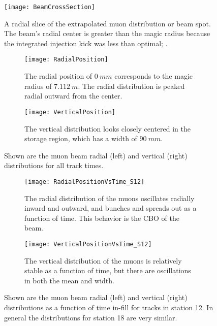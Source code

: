 \begin{figure}
  \centering
  \texttt{[image: BeamCrossSection]}
    \caption[Extrapolated muon beam distribution cross-section]{A radial slice of the extrapolated muon distribution or beam spot. The beam's radial center is greater than the magic radius because the integrated injection kick was less than optimal; .}
    \label{fig:BeamCrossSection}
\end{figure}


\begin{figure}
\centering
    \begin{subfigure}[t]{0.47\textwidth}
        \centering
        \texttt{[image: RadialPosition]}
        \caption{The radial position of $\SI{0}{mm}$ corresponds to the magic radius of $\SI{7.112}{m}$. The radial distribution is peaked radial outward from the center.}
    \end{subfigure}
    \hspace{5mm}
    \begin{subfigure}[t]{0.47\textwidth}
        \centering
        \texttt{[image: VerticalPosition]}
        \caption{The vertical distribution looks closely centered in the storage region, which has a width of $\SI{90}{mm}$.}
    \end{subfigure}
\caption[Muon beam radial and vertical distributions]{Shown are the muon beam radial (left) and vertical (right) distributions for all track times.}
\label{fig:RadialVerticalProjections}
\end{figure}



\begin{figure}
\centering
    \begin{subfigure}[t]{0.47\textwidth}
        \centering
        \texttt{[image: RadialPositionVsTime\_S12]}
        \caption{The radial distribution of the muons oscillates radially inward and outward, and bunches and spreads out as a function of time. This behavior is the CBO of the beam.}
    \end{subfigure}
    \hspace{5mm}
    \begin{subfigure}[t]{0.47\textwidth}
        \centering
        \texttt{[image: VerticalPositionVsTime\_S12]}
        \caption{The vertical distribution of the muons is relatively stable as a function of time, but there are oscillations in both the mean and width.}
    \end{subfigure}
\caption[Muon beam radial and vertical distributions as a function of time in-fill]{Shown are the muon beam radial (left) and vertical (right) distributions as a function of time in-fill for tracks in station 12. In general the distributions for station 18 are very similar.}
\label{fig:RadialVerticalVsTime}
\end{figure}




